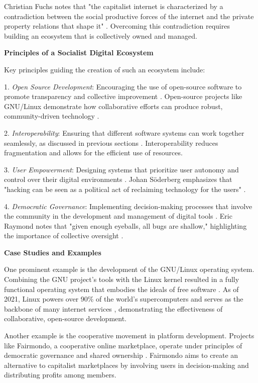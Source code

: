 \begin{refsection}
Christian Fuchs notes that "the capitalist internet is characterized by a contradiction between the social productive forces of the internet and the private property relations that shape it" \cite[pp.~60]{Fuchs2014}. Overcoming this contradiction requires building an ecosystem that is collectively owned and managed.

\textbf{Principles of a Socialist Digital Ecosystem}

Key principles guiding the creation of such an ecosystem include:

1. \textit{Open Source Development}: Encouraging the use of open-source software to promote transparency and collective improvement \cite[pp.~23-25]{Stallman2010}. Open-source projects like GNU/Linux demonstrate how collaborative efforts can produce robust, community-driven technology \cite[pp.~89-91]{Weber2005}.

2. \textit{Interoperability}: Ensuring that different software systems can work together seamlessly, as discussed in previous sections \cite[pp.~70-72]{Weber2005}. Interoperability reduces fragmentation and allows for the efficient use of resources.

3. \textit{User Empowerment}: Designing systems that prioritize user autonomy and control over their digital environments \cite[pp.~85-87]{Soderberg2007}. Johan Söderberg emphasizes that "hacking can be seen as a political act of reclaiming technology for the users" \cite[pp.~112]{Soderberg2007}.

4. \textit{Democratic Governance}: Implementing decision-making processes that involve the community in the development and management of digital tools \cite[pp.~150-152]{Raymond2022}. Eric Raymond notes that "given enough eyeballs, all bugs are shallow," highlighting the importance of collective oversight \cite[pp.~30]{Raymond2022}.

\textbf{Case Studies and Examples}

One prominent example is the development of the GNU/Linux operating system. Combining the GNU project's tools with the Linux kernel resulted in a fully functional operating system that embodies the ideals of free software \cite[pp.~23-25]{Stallman2010}. As of 2021, Linux powers over 90\% of the world's supercomputers and serves as the backbone of many internet services \cite[pp.~15-17]{LinuxFoundation2021}, demonstrating the effectiveness of collaborative, open-source development.

Another example is the cooperative movement in platform development. Projects like Fairmondo, a cooperative online marketplace, operate under principles of democratic governance and shared ownership \cite[pp.~89-91]{Scholz2016}. Fairmondo aims to create an alternative to capitalist marketplaces by involving users in decision-making and distributing profits among members.


\end{refsection}
